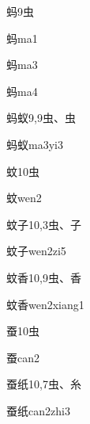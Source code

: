 \begin{Entry}{蚂}{9}{⾍}
  \begin{Phonetics}{蚂}{ma1}
  \end{Phonetics}
  \begin{Phonetics}{蚂}{ma3}
  \end{Phonetics}
  \begin{Phonetics}{蚂}{ma4}
  \end{Phonetics}
\end{Entry}

\begin{Entry}{蚂蚁}{9,9}{⾍、⾍}
  \begin{Phonetics}{蚂蚁}{ma3yi3}
  \end{Phonetics}
\end{Entry}

\begin{Entry}{蚊}{10}{⾍}
  \begin{Phonetics}{蚊}{wen2}
  \end{Phonetics}
\end{Entry}

\begin{Entry}{蚊子}{10,3}{⾍、⼦}
  \begin{Phonetics}{蚊子}{wen2zi5}
  \end{Phonetics}
\end{Entry}

\begin{Entry}{蚊香}{10,9}{⾍、⾹}
  \begin{Phonetics}{蚊香}{wen2xiang1}
  \end{Phonetics}
\end{Entry}

\begin{Entry}{蚕}{10}{⾍}
  \begin{Phonetics}{蚕}{can2}
  \end{Phonetics}
\end{Entry}

\begin{Entry}{蚕纸}{10,7}{⾍、⽷}
  \begin{Phonetics}{蚕纸}{can2zhi3}
  \end{Phonetics}
\end{Entry}

